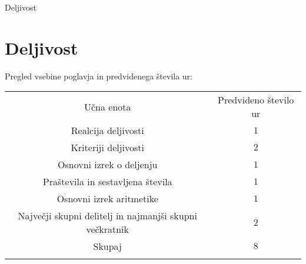 \begin{priprava}{0}{}{}{Deljivost}{}{}
    
    \chapter{Deljivost}

    \Large{Pregled vsebine poglavja in predvidenega števila ur:}

    \begin{table}[H]
        \centering
        \begin{tabular}{||c|c||} 
        \hhline{|t:==:t|}
        \rowcolor[rgb]{0.843,0.718,0.718} 
        Učna enota  & Predvideno število ur   \\ 
        \hhline{|:==:|}
        Realcija deljivosti & $1$    \\ 
        \hline
        Kriteriji deljivosti & $2$    \\ 
        \hline
        Osnovni izrek o deljenju & $1$    \\ 
        \hline
        Praštevila in sestavljena števila & $1$     \\
        \hline
        Osnovni izrek aritmetike & $1$     \\
        \hline
        Največji skupni delitelj in najmanjši skupni večkratnik & $2$    \\ 
        \hhline{|:==:|}
        Skupaj & $8$     \\
        \hhline{|b:==:b|}
        \end{tabular}
    \end{table}


    
\end{priprava}